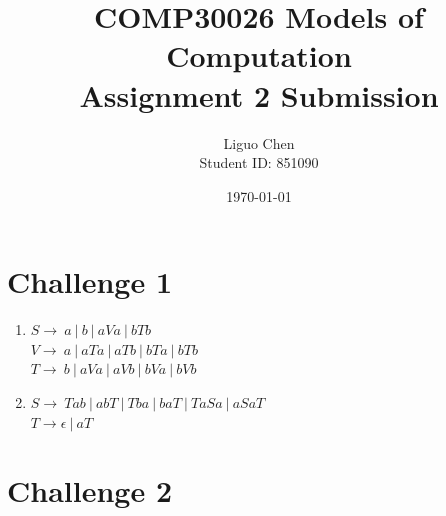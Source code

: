 \documentclass{article}
\title{COMP30026 Models of Computation \\ 
       Assignment 2 Submission}
\author{Liguo Chen\\Student ID: 851090}
\date{\today}
\begin{document}
\maketitle

\section*{Challenge 1}

\begin{enumerate}
    
    \item
    $S \rightarrow\ a\ |\ b\ |\ aVa\ |\ bTb$\\
    $V \rightarrow\ a\ |\ aTa\ |\ aTb\ |\ bTa\ |\ bTb$\\
    $T \rightarrow\ b\ |\ aVa\ |\ aVb\ |\ bVa\ |\ bVb$
    \item
    $S \rightarrow\ Tab\ |\ abT\ |\ Tba\ |\ baT\ |\ TaSa\ |\ aSaT$\\
    $T \rightarrow \epsilon\ |\ aT$
\end{enumerate}

\section*{Challenge 2}
\end{document}
